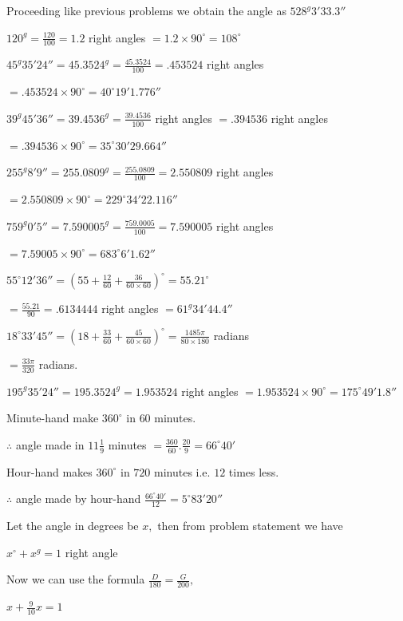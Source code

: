     Proceeding like previous problems we obtain the angle as $528^g3'33.3''$
\item $120^g = \frac{120}{100} = 1.2$ right angles $= 1.2\times 90^\circ = 108^\circ$
\item $45^g35'24'' = 45.3524^g = \frac{45.3524}{100} = .453524$ right angles

    $= .453524 \times 90^\circ = 40^\circ19'1.776''$
\item $39^g45'36'' = 39.4536^g = \frac{39.4536}{100}$ right angles $= .394536$ right angles

    $= .394536\times 90^\circ = 35^\circ30'29.664''$
\item $255^g8'9'' = 255.0809^g = \frac{255.0809}{100} = 2.550809$ right angles

    $= 2.550809 \times 90^\circ = 229^\circ34'22.116''$
\item $759^g0'5'' = 7.590005^g = \frac{759.0005}{100} = 7.590005$ right angles

    $= 7.59005\times 90^\circ = 683^\circ6'1.62''$
\item $55^\circ12'36'' = \left(55 + \frac{12}{60} + \frac{36}{60\times 60}\right)^\circ = 55.21^\circ$

    $= \frac{55.21}{90} = .6134444$ right angles $= 61^g34'44.4''$
\item $18^\circ33'45'' = \left(18 + \frac{33}{60} + \frac{45}{60\times60}\right)^\circ = \frac{1485\pi}{80\times180}$ radians

    $= \frac{33\pi}{320}$ radians.
\item $195^g35'24'' = 195.3524^g = 1.953524$ right angles $= 1.953524\times90^\circ = 175^\circ49'1.8''$
\item Minute-hand make $360^\circ$ in $60$ minutes.

    $\therefore$ angle made in $11\frac{1}{9}$ minutes $= \frac{360}{60}.\frac{20}{9} = 66^\circ40'$

    Hour-hand makes $360^\circ$ in $720$ minutes i.e. $12$ times less.

    $\therefore$ angle made by hour-hand $\frac{66^\circ40'}{12} = 5^\circ83'20''$
\item Let the angle in degrees be $x,$ then from problem statement we have

    $x^\circ + x^g = 1$ right angle

    Now we can use the formula $\frac{D}{180} = \frac{G}{200},$

    $x + \frac{9}{10}x = 1$

